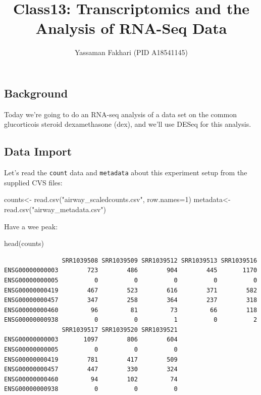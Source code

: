 \documentclass[
  letterpaper,
  DIV=11,
  numbers=noendperiod]{scrartcl}
\title{Class13: Transcriptomics and the Analysis of RNA-Seq Data}
\author{Yassaman Fakhari (PID A18541145)}
\date{}
\newenvironment{Shaded}{\begin{snugshade}}{\end{snugshade}}
\newcommand{\AttributeTok}[1]{\textcolor[rgb]{0.40,0.45,0.13}{#1}}
\newcommand{\DecValTok}[1]{\textcolor[rgb]{0.68,0.00,0.00}{#1}}
\newcommand{\FunctionTok}[1]{\textcolor[rgb]{0.28,0.35,0.67}{#1}}
\newcommand{\NormalTok}[1]{\textcolor[rgb]{0.00,0.23,0.31}{#1}}
\newcommand{\OtherTok}[1]{\textcolor[rgb]{0.00,0.23,0.31}{#1}}
\newcommand{\StringTok}[1]{\textcolor[rgb]{0.13,0.47,0.30}{#1}}
\renewcommand*\contentsname{Table of contents}
\newcommand\contentsname{Table of contents}
\begin{document}
\maketitle

\renewcommand*\contentsname{Table of contents}
{
\hypersetup{linkcolor=}
\setcounter{tocdepth}{3}
\tableofcontents
}

\subsection{Background}\label{background}

Today we're going to do an RNA-seq analysis of a data set on the common
glucorticois steroid dexamethasone (dex), and we'll use DESeq for this
analysis.

\subsection{Data Import}\label{data-import}

Let's read the \texttt{count} data and \texttt{metadata} about this
experiment setup from the supplied CVS files:

\begin{Shaded}
\begin{Highlighting}[]
\NormalTok{counts}\OtherTok{\textless{}{-}} \FunctionTok{read.csv}\NormalTok{(}\StringTok{"airway\_scaledcounts.csv"}\NormalTok{, }\AttributeTok{row.names=}\DecValTok{1}\NormalTok{)}
\NormalTok{metadata}\OtherTok{\textless{}{-}} \FunctionTok{read.csv}\NormalTok{(}\StringTok{"airway\_metadata.csv"}\NormalTok{)}
\end{Highlighting}
\end{Shaded}

Have a wee peak:

\begin{Shaded}
\begin{Highlighting}[]
\FunctionTok{head}\NormalTok{(counts)}
\end{Highlighting}
\end{Shaded}

\begin{verbatim}
                SRR1039508 SRR1039509 SRR1039512 SRR1039513 SRR1039516
ENSG00000000003        723        486        904        445       1170
ENSG00000000005          0          0          0          0          0
ENSG00000000419        467        523        616        371        582
ENSG00000000457        347        258        364        237        318
ENSG00000000460         96         81         73         66        118
ENSG00000000938          0          0          1          0          2
                SRR1039517 SRR1039520 SRR1039521
ENSG00000000003       1097        806        604
ENSG00000000005          0          0          0
ENSG00000000419        781        417        509
ENSG00000000457        447        330        324
ENSG00000000460         94        102         74
ENSG00000000938          0          0          0
\end{verbatim}
\end{document}
